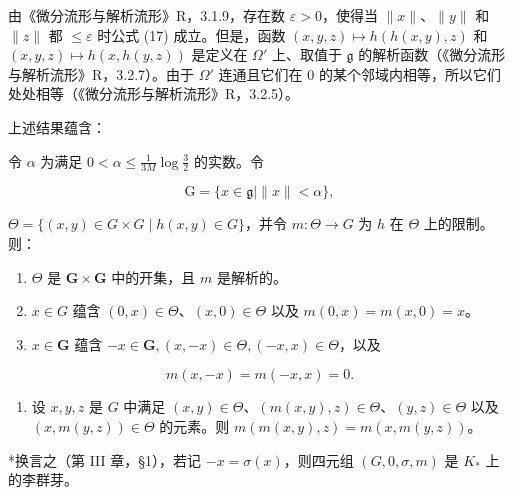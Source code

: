 由《微分流形与解析流形》R，3.1.9，存在数 \(\varepsilon > 0\)，使得当 \(\|x\|\)、\(\|y\|\) 和 \(\|z\|\) 都 \(\leqslant \varepsilon\) 时公式 (17) 成立。但是，函数 \((x,y,z)\mapsto h(h(x,y),z)\) 和 \((x,y,z)\mapsto h(x,h(y,z))\) 是定义在 \(\Omega'\) 上、取值于 \(\mathfrak{g}\) 的解析函数（《微分流形与解析流形》R，3.2.7）。由于 \(\Omega'\) 连通且它们在 0 的某个邻域内相等，所以它们处处相等（《微分流形与解析流形》R，3.2.5）。

上述结果蕴含：

令 \(\alpha\) 为满足 \(0 < \alpha \leqslant \frac{1}{3M} \log \frac{3}{2}\) 的实数。令

\[
\mathrm{G} = \{x \in \mathfrak {g} \mid \| x \| <   \alpha \},
\]

\(\Theta = \{(x,y) \in G \times G \mid h(x,y) \in G\}\)，并令 \(m: \Theta \to G\) 为 \(h\) 在 \(\Theta\) 上的限制。则：

\begin{enumerate}
\def\labelenumi{(\arabic{enumi})}
\item
  \(\Theta\) 是 \(\mathbf{G} \times \mathbf{G}\) 中的开集，且 \(m\) 是解析的。
\item
  \(x \in G\) 蕴含 \((0, x) \in \Theta\)、\((x, 0) \in \Theta\) 以及 \(m(0, x) = m(x, 0) = x\)。
\item
  \(x \in \mathbf{G}\) 蕴含 \(-x \in \mathbf{G}, (x, -x) \in \Theta, (-x, x) \in \Theta\)，以及
\end{enumerate}

\[
m (x, - x) = m (- x, x) = 0.
\]

\begin{enumerate}
\def\labelenumi{(\arabic{enumi})}
\setcounter{enumi}{3}
\tightlist
\item
  设 \(x, y, z\) 是 \(G\) 中满足 \((x, y) \in \Theta\)、\((m(x, y), z) \in \Theta\)、\((y, z) \in \Theta\) 以及 \((x, m(y, z)) \in \Theta\) 的元素。则 \(m(m(x, y), z) = m(x, m(y, z))\)。
\end{enumerate}

*换言之（第 III 章，§1），若记 \(-x = \sigma(x)\)，则四元组 \((G, 0, \sigma, m)\) 是 \(K_*\) 上的李群芽。

